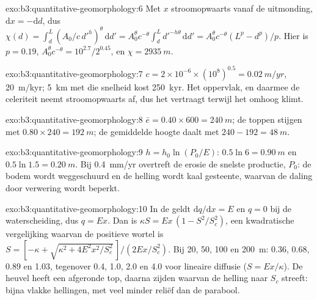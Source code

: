 \begin{solution}{exo:b3:quantitative-geomorphology:6}
\sloppy Met $x$ stroomopwaarts vanaf de uitmonding, $\mathrm{d}x = -\mathrm{d}d$, dus $\chi(d)
= \int_d^L (A_0/c\,d'^{h})^{\theta}\,\mathrm{d}d' = A_0^{\theta} c^{-\theta}
\int_d^L d'^{-h\theta}\,\mathrm{d}d' = A_0^{\theta}c^{-\theta}(L^p -
d^p)/p$. Hier is $p = 0.19$, $A_0^{\theta}c^{-\theta} = 10^{2.7}/2^{0.45}$,
en $\chi = \qty{2935}{m}$.\par
\end{solution}

\begin{solution}{exo:b3:quantitative-geomorphology:7}
$c = 2\times10^{-6}\times(10^8)^{0.5} = \qty{0.02}{m/yr}$, \qty{20}{m/kyr};
\qty{5}{km} met die snelheid kost \qty{250}{kyr}. Het oppervlak, en daarmee de
celeriteit neemt stroomopwaarts af, dus het  vertraagt terwijl het omhoog klimt.
\end{solution}

\begin{solution}{exo:b3:quantitative-geomorphology:8}
$\bar e = 0.40\times600 = \qty{240}{m}$; de toppen stijgen met $0.80\times240 =
\qty{192}{m}$; de gemiddelde hoogte daalt met $240 - 192 = \qty{48}{m}$.
\end{solution}

\begin{solution}{exo:b3:quantitative-geomorphology:9}
$h = h_0\ln(P_0/E)$: $0.5\ln 6 = \qty{0.90}{m}$ en $0.5\ln1.5 =
\qty{0.20}{m}$. Bij \qty{0.4}{mm/yr} overtreft de erosie de snelste productie,
$P_0$: de bodem wordt weggeschuurd en de helling wordt kaal gesteente, waarvan
de daling door verwering wordt beperkt.
\end{solution}

\begin{solution}{exo:b3:quantitative-geomorphology:10}
In de  geldt $\mathrm{d}q/\mathrm{d}x = E$ en $q = 0$ bij de waterscheiding, dus
$q = E x$. Dan is $\kappa S = E x\,(1 - S^2/S_c^2)$, een kwadratische vergelijking waarvan de positieve
wortel is $S = [-\kappa + \sqrt{\kappa^2 + 4E^2x^2/S_c^2}\,]/(2Ex/S_c^2)$. Bij
20, 50, 100 en \qty{200}{m}: 0.36, 0.68, 0.89 en 1.03, tegenover 0.4, 1.0,
2.0 en 4.0 voor lineaire diffusie ($S = Ex/\kappa$). De heuvel heeft een
afgeronde top, daarna zijden waarvan de helling naar $S_c$ streeft: bijna
vlakke hellingen, met veel minder reliëf dan de parabool.
\end{solution}


